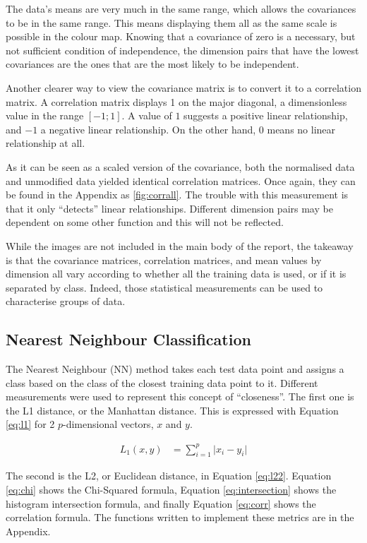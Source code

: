 \documentclass[a4paper, 10pt, conference]{ieeeconf}
\begin{document}
The data's means are very much in the same range, which allows the covariances to be in the same range. This means displaying them all as the same scale is possible in the colour map. Knowing that a covariance of zero is a necessary, but not sufficient condition of independence, the dimension pairs that have the lowest covariances are the ones that are the most likely to be independent.

Another clearer way to view the covariance matrix is to convert it to a correlation matrix. A correlation matrix displays 1 on the major diagonal, a dimensionless value in the range $[-1; 1]$. A value of $1$ suggests a positive linear relationship, and $-1$ a negative linear relationship. On the other hand, $0$ means no linear relationship at all.

As it can be seen as a scaled version of the covariance, both the normalised data and unmodified data yielded identical correlation matrices. Once again, they can be found in the Appendix as \ref{fig:corrall}. The trouble with this measurement is that it only ``detects'' linear relationships. Different dimension pairs may be dependent on some other function and this will not be reflected.

While the images are not included in the main body of the report, the takeaway is that the covariance matrices, correlation matrices, and mean values by dimension all vary according to whether all the training data is used, or if it is separated by class. Indeed, those statistical measurements can be used to characterise groups of data.

\subsection{Nearest Neighbour Classification}
The Nearest Neighbour (NN) method takes each test data point and assigns a class based on the class of the closest training data point to it. Different measurements were used to represent this concept of ``closeness''. The first one is the L1 distance, or the Manhattan distance. This is expressed with Equation \ref{eq:l1} for 2 $p$-dimensional vectors, $x$ and $y$.

\begin{align}
  L_1 \left( x, y \right) &= \sum_{i = 1}^{p} \lvert x_i  - y_i \rvert \label{eq:l1}
\end{align}

The second is the L2, or Euclidean distance, in Equation \ref{eq:l22}. Equation \ref{eq:chi} shows the Chi-Squared formula, Equation \ref{eq:intersection} shows the histogram intersection formula, and finally Equation \ref{eq:corr} shows the correlation formula. The functions written to implement these metrics are in the Appendix.
\end{document}
